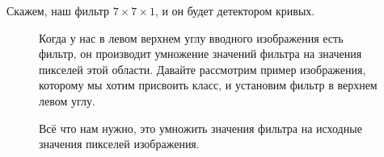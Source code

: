 \documentclass[paper=a4, fontsize=11pt]{scrartcl} %
\numberwithin{equation}{section} %
\numberwithin{figure}{section} %
\numberwithin{table}{section} %
\begin{document}
	Скажем, наш фильтр $ 7 \times 7 \times 1$, и он будет детектором кривых.
	
	\begin{figure}[h!]
	\end{figure}

	\begin{figure}[h!]
		Когда у нас в левом верхнем углу вводного изображения есть фильтр, он производит умножение значений фильтра на значения пикселей этой области. Давайте рассмотрим пример изображения, которому мы хотим присвоить класс, и установим фильтр в верхнем левом углу.
	\end{figure}

	

	\begin{figure}[h!]
	\end{figure}

	\begin{figure}[h!]
		Всё что нам нужно, это умножить значения фильтра на исходные значения пикселей изображения.
	\end{figure}
	

	\begin{figure}[h!]
	\end{figure}
\end{document}
